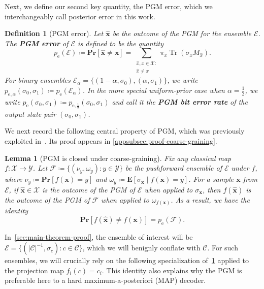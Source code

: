 \documentclass[11pt]{article}
\newtheorem{lemma}[lemma]{Lemma}
\newtheorem{definition}{Definition}[section]
\theoremstyle{remark}
\newcommand{\cC}{\mathcal{C}}
\newcommand{\cX}{\mathcal{X}}
\newcommand{\cY}{\mathcal{Y}}
\newcommand{\cE}{\mathcal{E}}
\newcommand{\cF}{\mathcal{F}}
\newcommand{\Tr}{\operatorname{Tr}}
\newcommand{\Eb}{\mathbf{E}}
\newcommand{\Prb}{\mathbf{Pr}}
\newcommand{\bxhat}{\hat{\mathbf{x}}}
\newcommand{\bx}{\mathbf{x}}
\newcommand{\abs}[1]{\left|#1\right|}
\begin{document}
Next, we define our second key quantity, the PGM error, which we interchangeably call posterior error in this work.

\begin{definition}[PGM error]
\label{def:pgm-error}
Let $\bxhat$ be the outcome of the PGM for the ensemble $\cE$. The \textbf{PGM error} of $\cE$ is defined to be the quantity
\begin{equation*}
p_{\mathrm{e}}(\cE) \coloneqq \Prb[\bxhat \neq \bx] = \sum_{\substack{\hat{x},x \in \cX : \\ \hat{x} \neq x}}{\pi_x\Tr(\sigma_x M_{\hat{x}})}.
\end{equation*}
For binary ensembles $\cE_\alpha = \{(1-\alpha,\sigma_0),(\alpha,\sigma_1)\}$, we write $p_{\mathrm{e},\alpha}(\sigma_0,\sigma_1) \coloneqq p_{\mathrm{e}}(\cE_\alpha)$. In the more special uniform-prior case when $\alpha = \frac{1}{2}$, we write $p_{\mathrm{e}}(\sigma_0,\sigma_1) \coloneqq p_{\mathrm{e},\frac{1}{2}}(\sigma_0,\sigma_1)$ and call it the \textbf{PGM bit error rate} of the output state pair $(\sigma_0,\sigma_1)$.
\end{definition}

We next record the following central property of PGM, which was previously exploited in~\cite{KT08,BJL23,LdW25}. Its proof appears in \cref{appsubsec:proof-coarse-graining}.

\begin{lemma}[PGM is closed under coarse-graining]
\label{lem:coarse-graining}
Fix any classical map $f: \cX \to \cY$. Let $\cF \coloneqq \{(\nu_y,\omega_y) : y \in \cY\}$ be the pushforward ensemble of $\cE$ under $f$, where $\nu_y \coloneqq \Prb[f(\bx) = y]$ and $\omega_y \coloneqq \Eb[\sigma_{\bx} \mid f(\bx) = y]$. For a sample $\bx$ from $\cE$, if $\bxhat \in \cX$ is the outcome of the PGM of $\cE$ when applied to $\sigma_{\bx}$, then $f(\bxhat)$ is the outcome of the PGM of $\cF$ when applied to $\omega_{f(\bx)}$. As a result, we have the identity
\begin{equation*}
\Prb[f(\bxhat) \neq f(\bx)] = p_{\mathrm{e}}(\cF).
\end{equation*}
\end{lemma}

In~\cref{sec:main-theorem-proof}, the ensemble of interest will be $\cE = \{(\abs{\cC}^{-1}, \sigma_c) : c \in \cC\}$, which we will benignly conflate with $\cC$. For such ensembles, we will crucially rely on the following specialization of~\cref{lem:coarse-graining} applied to the projection map $f_i(c) = c_i$. This identity also explains why the PGM is preferable here to a hard maximum-a-posteriori (MAP) decoder.
\end{document}
